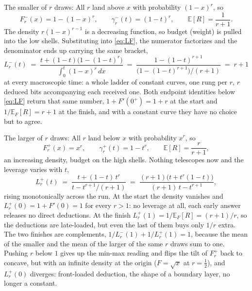 \documentclass[11pt]{article}
\begin{document}
The smaller of $r$ draws: All $r$ land above $x$ with
probability $(1-x)^r$, so
%
\begin{equation}
  F^-_r(x) = 1 - (1-x)^r,
  \qquad
  \gamma^-_r(t) = (1-t)^r,
  \qquad
  \mathbb E[R] = \frac1{r+1} .
  \label{eq:Fmin}
\end{equation}
%
The density $r(1-x)^{r-1}$ is a decreasing function, so budget (weight) is pulled into the low
shells. Substituting into \eqref{eq:LF}, the numerator factorizes and
the denominator ends up carrying the same bracket,
%
\begin{equation}
  L^-_r(t)
  \;=\; \frac{t + (1-t)\big(1-(1-t)^r\big)}
             {\displaystyle\int_0^t (1-x)^r\, dx}
  \;=\; \frac{1-(1-t)^{r+1}}{\big(1-(1-t)^{r+1}\big)\big/(r+1)}
  \;=\; r+1
  \label{eq:Lmin}
\end{equation}
%
at every macroscopic time: a whole ladder of constant curves, one rung
per $r$, $r$ deduced bits accompanying each received one. Both endpoint
identities below \eqref{eq:LF} return that same number, $1 + F'(0^+) =
1 + r$ at the start and $1/\mathbb E_F[R] = r+1$ at the finish, and with
a constant curve they have no choice but to agree.

The larger of $r$ draws: All $r$ land below $x$ with
probability $x^r$, so
%
\begin{equation}
  F^+_r(x) = x^r,
  \qquad
  \gamma^+_r(t) = 1 - t^r,
  \qquad
  \mathbb E[R] = \frac r{r+1} ,
  \label{eq:Fmax}
\end{equation}
%
an increasing density, budget on the high shells. Nothing telescopes
now and the leverage varies with $t$,
%
\begin{equation}
  L^+_r(t)
  \;=\; \frac{t + (1-t)\,t^r}{t - t^{r+1}/(r+1)}
  \;=\; \frac{(r+1)\big(t + t^r(1-t)\big)}{(r+1)\,t - t^{r+1}},
  \label{eq:Lmax}
\end{equation}
%
rising monotonically across the run. At the start the density vanishes
and $L^+_r(0) = 1 + F'(0) = 1$ for every $r > 1$: no leverage at
all, each early answer releases no direct deductions. At the finish
$L^+_r(1) = 1/\mathbb E_F[R] = (r+1)/r$, so the deductions are
late-loaded, but even the last of them buys only $1/r$ extra. The two
finishes are complements, $1/L^-_r(1) + 1/L^+_r(1) = 1$, because the
mean of the smaller and the mean of the larger of the same $r$ draws
sum to one. Pushing $r$ below $1$ gives up the min-max reading and
flips the tilt of $F^+_r$ back to concave, but with an infinite
density at the origin ($F = \sqrt x$ at $r = \tfrac12$), and
$L^+_r(0)$ diverges: front-loaded deduction, the shape of a boundary
layer, no longer a constant.
\end{document}
